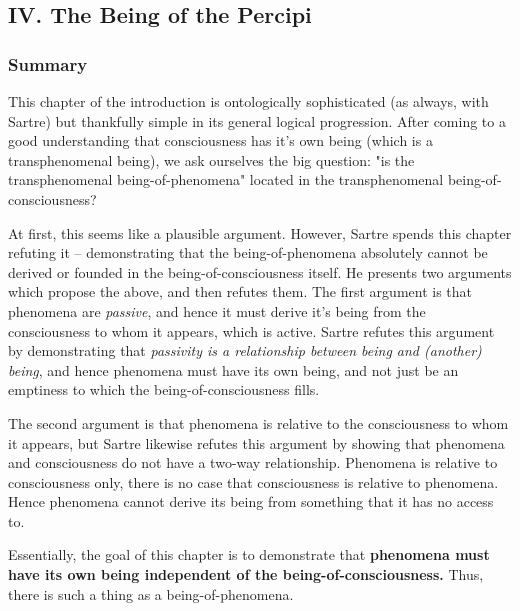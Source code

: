 \subsection{IV. The Being of the Percipi}
\subsubsection*{Summary}
This chapter of the introduction is ontologically sophisticated (as always, with Sartre) but thankfully simple in its general logical progression. After coming to a good understanding that consciousness has it's own being (which is a transphenomenal being), we ask ourselves the big question: "is the transphenomenal being-of-phenomena" located in the transphenomenal being-of-consciousness?

At first, this seems like a plausible argument. However, Sartre spends this chapter refuting it -- demonstrating that the being-of-phenomena absolutely cannot be derived or founded in the being-of-consciousness itself. He presents two arguments which propose the above, and then refutes them. The first argument is that phenomena are \emph{passive}, and hence it must derive it's being from the consciousness to whom it appears, which is active. Sartre refutes this argument by demonstrating that \emph{passivity is a relationship between being and (another) being}, and hence phenomena must have its own being, and not just be an emptiness to which the being-of-consciousness fills.

The second argument is that phenomena is relative to the consciousness to whom it appears, but Sartre likewise refutes this argument by showing that phenomena and consciousness do not have a two-way relationship. Phenomena is relative to consciousness only, there is no case that consciousness is relative to phenomena. Hence phenomena cannot derive its being from something that it has no access to.

Essentially, the goal of this chapter is to demonstrate that \textbf{phenomena must have its own being independent of the being-of-consciousness.} Thus, there is such a thing as a being-of-phenomena.

